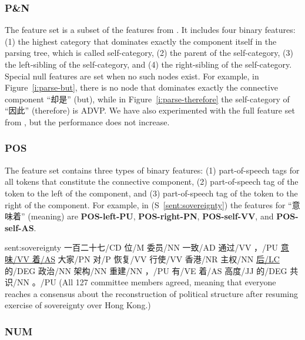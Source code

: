 \subsubsection{P\&N}

The feature set is a subset of the features from
\cite{pitler2009using}. It includes four binary features:
(1) the highest category that dominates exactly the component
itself in the parsing tree, which is called self-category, (2) the parent of the self-category,
(3) the left-sibling of the self-category, and (4) the right-sibling of the self-category.
Special null features are set when no such nodes exist. For example,
in Figure~\ref{i:parse-but}, there is no node that dominates exactly the
connective component ``却是'' (but), while in Figure~\ref{i:parse-therefore} the
self-category of ``因此'' (therefore) is ADVP. We have also experimented
with the full feature set from \cite{pitler2009using}, but the performance
does not increase.



\subsubsection{POS}

The feature set contains three types of binary features:
(1) part-of-speech tags for all tokens that constitute the connective component,
(2) part-of-speech tag of the token to the left of the component, and
(3) part-of-speech tag of the token to the right of the component. For example,
in (S~\ref{sent:sovereignty}) the features for ``意味着'' (meaning) are
\textbf{POS-left-PU}, \textbf{POS-right-PN}, \textbf{POS-self-VV}, and
\textbf{POS-self-AS}.

\begin{sent}{sent:sovereignty}{}
    一百二十七/CD 位/M 委员/NN 一致/AD 通过/VV ，/PU \underline{意味/VV 着/AS} 大家/PN 对/P
    恢复/VV 行使/VV 香港/NR 主权/NN \underline{后/LC} 的/DEG 政治/NN 架构/NN 重建/NN ，/PU
    有/VE 着/AS 高度/JJ 的/DEG 共识/NN 。/PU
    (All 127 committee members agreed, meaning that everyone reaches a consensus about
    the reconstruction of political structure after resuming exercise of sovereignty over Hong Kong.)
\end{sent}

\subsubsection{NUM}

